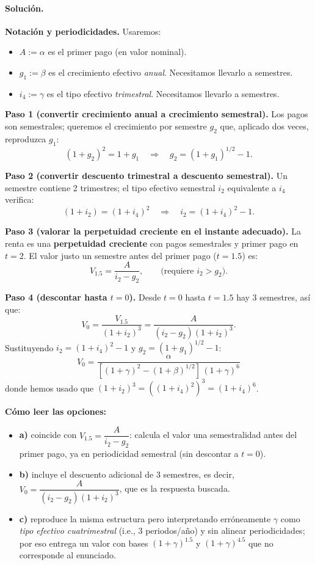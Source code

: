 \documentclass[12pt,a4paper]{article}
\newenvironment{solucion}{\paragraph{Solución.}}{}
\begin{document}
\begin{solucion}
\textbf{Notación y periodicidades.} \; Usaremos:
\begin{itemize}
  \item $A:=\alpha$ es el primer pago (en valor nominal).
  \item $g_1:=\beta$ es el crecimiento efectivo \emph{anual}. Necesitamos llevarlo a semestres.
  \item $i_4:=\gamma$ es el tipo efectivo \emph{trimestral}. Necesitamos llevarlo a semestres.
\end{itemize}

\textbf{Paso 1 (convertir crecimiento anual a crecimiento semestral).} \;
Los pagos son semestrales; queremos el crecimiento por semestre $g_2$ que, aplicado dos veces, reproduzca $g_1$:
\[
(1+g_2)^2=1+g_1
\quad\Rightarrow\quad
g_2=(1+g_1)^{1/2}-1.
\]

\textbf{Paso 2 (convertir descuento trimestral a descuento semestral).} \;
Un semestre contiene 2 trimestres; el tipo efectivo semestral $i_2$ equivalente a $i_4$ verifica:
\[
(1+i_2)=(1+i_4)^2
\quad\Rightarrow\quad
i_2=(1+i_4)^2-1.
\]

\textbf{Paso 3 (valorar la perpetuidad creciente en el instante adecuado).} \;
La renta es una \textbf{perpetuidad creciente} con pagos semestrales y primer pago en $t=2$.
El valor justo un semestre antes del primer pago ($t=1.5$) es:
\[
V_{1.5}=\frac{A}{i_2-g_2},
\qquad \text{(requiere } i_2>g_2\text{)}.
\]

\textbf{Paso 4 (descontar hasta $t=0$).} \;
Desde $t=0$ hasta $t=1.5$ hay $3$ semestres, así que:
\[
V_0=\frac{V_{1.5}}{(1+i_2)^3}
=\frac{A}{(i_2-g_2)(1+i_2)^3}.
\]
Sustituyendo $i_2=(1+i_4)^2-1$ y $g_2=(1+g_1)^{1/2}-1$:
\[
\boxed{
V_0=\frac{\alpha}{\left[(1+\gamma)^2-(1+\beta)^{1/2}\right]\,(1+\gamma)^6}
}
\]
donde hemos usado que $(1+i_2)^3=((1+i_4)^2)^3=(1+i_4)^6$.

\medskip
\textbf{Cómo leer las opciones:}
\begin{itemize}
  \item \textbf{a)} coincide con $V_{1.5}=\dfrac{A}{i_2-g_2}$: calcula el valor una semestralidad antes del primer pago, ya en periodicidad semestral (sin descontar a $t=0$).
  \item \textbf{b)} incluye el descuento adicional de 3 semestres, es decir, $V_0=\dfrac{A}{(i_2-g_2)(1+i_2)^3}$, que es la respuesta buscada.
  \item \textbf{c)} reproduce la misma estructura pero interpretando erróneamente $\gamma$ como \emph{tipo efectivo cuatrimestral} (i.e., 3 periodos/año) y sin alinear periodicidades; por eso entrega un valor con bases $(1+\gamma)^{1.5}$ y $(1+\gamma)^{4.5}$ que no corresponde al enunciado.
\end{itemize}
\end{solucion}
\end{document}

